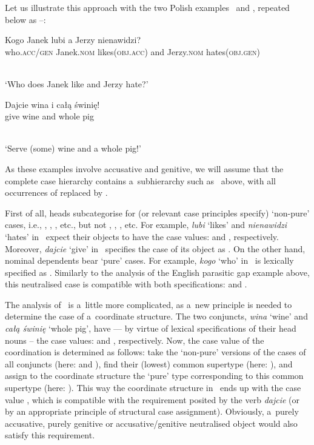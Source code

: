 \documentclass[output=paper]{langsci/langscibook}
\begin{document}
Let us illustrate this approach with the two Polish examples~ and , repeated below as –:
\begin{examples}
\item\label{ex:syn:pc:again} 
  \begin{gloss}
    Kogo Janek lubi a Jerzy nienawidzi? \\
    who.\textsc{acc/gen} Janek.\textsc{nom} likes(\textsc{obj.acc}) and Jerzy.\textsc{nom} hates(\textsc{obj.gen})
  \end{gloss}\\[\glosslen]
  ‘Who does Janek like and Jerzy hate?’
\item\label{ex:dis:pl:again}
  \begin{gloss}
    Dajcie wina i całą świnię! \\
    give wine\Gen{} and whole\Acc{} pig\Acc{}
  \end{gloss}\\[\glosslen]
  ‘Serve (some) wine and a whole pig!’
\end{examples}
As these examples involve accusative and genitive, we will assume that the complete case hierarchy contains a~subhierarchy such as~ above, with all occurrences of  replaced by .

First of all, heads subcategorise for (or relevant case principles specify) ‘non-pure’ cases, i.e., , , , etc., but not , , , etc.  For example, \emph{lubi} ‘likes’ and \emph{nienawidzi} ‘hates’ in~ expect their objects to have the case values:  and , respectively.  Moreover, \emph{dajcie} ‘give’ in~ specifies the case of its object as .  On the other hand, nominal dependents bear ‘pure’ cases.  For example, \emph{kogo} ‘who’ in~ is lexically specified as .  Similarly to the analysis of the English parasitic gap example above, this neutralised case is compatible with both specifications:  and .

The analysis of~ is a~little more complicated, as a~new principle is needed to determine the case of a~coordinate structure.  The two conjuncts, \emph{wina} ‘wine’ and \emph{całą świnię} ‘whole pig’, have — by virtue of lexical specifications of their head nouns – the case values:  and , respectively.  Now, the case value of the coordination is determined as follows: take the ‘non-pure’ versions of the cases of all conjuncts (here:  and ), find their (lowest) common supertype (here: ), and assign to the coordinate structure the ‘pure’ type corresponding to this common supertype (here: ).  This way the coordinate structure in~ ends up with the case value , which is compatible with the  requirement posited by the verb \emph{dajcie} (or by an appropriate principle of structural case assignment).  Obviously, a~purely accusative, purely genitive or accusative/genitive neutralised object would also satisfy this requirement.
\end{document}
